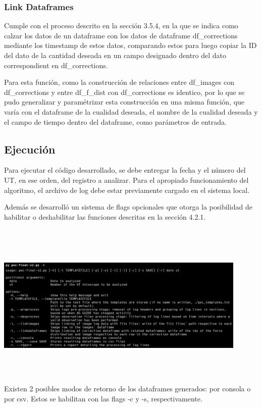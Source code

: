 \subsubsection{Link Dataframes}
Cumple con el proceso descrito en la sección 3.5.4, en la que se indica como calzar los datos de un dataframe con los datos de dataframe df\_corrections mediante los timestamp de estos datos, comparando estos para luego copiar la ID del dato de la cantidad deseada en un campo designado dentro del dato correspondient en df\_corrections.

Para esta función, como la construcción de relaciones entre df\_images con df\_corrections y entre df\_f\_dist con df\_corrections es identico, por lo que se pudo generalizar y paramétrizar esta construcción en una misma función, que varía con el dataframe de la cualidad deseada, el nombre de la cualidad deseada y el campo de tiempo dentro del dataframe, como parámetros de entrada.

\subsection{Ejecución}

Para ejecutar el código desarrollado, se debe entregar la fecha y el número del UT, en ese orden, del registro a analizar. Para el apropiado funcionamiento del algoritmo, el archivo de log debe estar previamente cargado en el sistema local.

Además se desarrolló un sistema de flags opcionales que otorga la posibilidad de habilitar o deshabilitar las funciones descritas en la sección 4.2.1.

\includegraphics[width=12cm,height=8cm]{figures/flags.png} \\

Existen 2 posibles modos de retorno de los dataframes generados: por consola o por csv. Estos se habilitan con las flags -c y -s, respectivamente.

